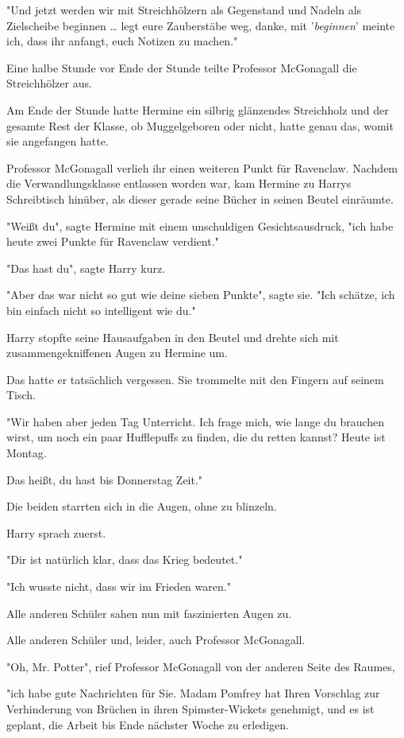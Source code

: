 {"Und jetzt werden wir mit Streichhölzern als Gegenstand und Nadeln als Zielscheibe beginnen … legt eure Zauberstäbe weg, danke, mit '\emph{beginnen}' meinte ich, dass ihr anfangt, euch Notizen zu machen."

Eine halbe Stunde vor Ende der Stunde teilte Professor McGonagall die Streichhölzer aus.

Am Ende der Stunde hatte Hermine ein silbrig glänzendes Streichholz und der gesamte Rest der Klasse, ob Muggelgeboren oder nicht, hatte genau das, womit sie angefangen hatte.

Professor McGonagall verlieh ihr einen weiteren Punkt für Ravenclaw. Nachdem die Verwandlungsklasse entlassen worden war, kam Hermine zu Harrys Schreibtisch hinüber, als dieser gerade seine Bücher in seinen Beutel einräumte.

"Weißt du", sagte Hermine mit einem unschuldigen Gesichtsausdruck, "ich habe heute zwei Punkte für Ravenclaw verdient."

"Das hast du", sagte Harry kurz.

"Aber das war nicht so gut wie deine sieben Punkte", sagte sie. "Ich schätze, ich bin einfach nicht so intelligent wie du."

Harry stopfte seine Hausaufgaben in den Beutel und drehte sich mit zusammengekniffenen Augen zu Hermine um.

Das hatte er tatsächlich vergessen. Sie trommelte mit den Fingern auf seinem Tisch.

"Wir haben aber jeden Tag Unterricht. Ich frage mich, wie lange du brauchen wirst, um noch ein paar Hufflepuffs zu finden, die du retten kannst? Heute ist Montag.

Das heißt, du hast bis Donnerstag Zeit."

Die beiden starrten sich in die Augen, ohne zu blinzeln.

Harry sprach zuerst.

"Dir ist natürlich klar, dass das Krieg bedeutet."

"Ich wusste nicht, dass wir im Frieden waren."

Alle anderen Schüler sahen nun mit faszinierten Augen zu.

Alle anderen Schüler und, leider, auch Professor McGonagall.

"Oh, Mr. Potter", rief Professor McGonagall von der anderen Seite des Raumes,

"ich habe gute Nachrichten für Sie. Madam Pomfrey hat Ihren Vorschlag zur Verhinderung von Brüchen in ihren Spimster-Wickets genehmigt, und es ist geplant, die Arbeit bis Ende nächster Woche zu erledigen.

}
